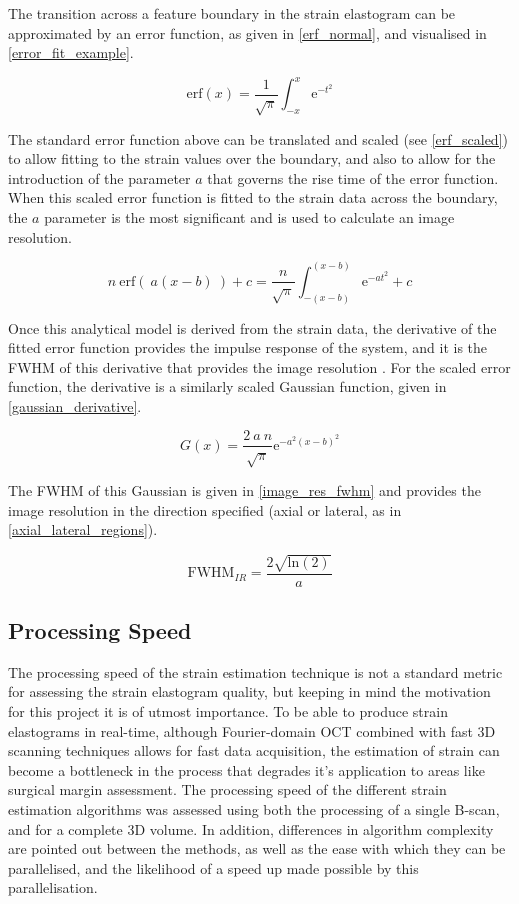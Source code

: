 The transition across a feature boundary in the strain elastogram can be approximated by an error function, as given in \autoref{erf_normal}, and visualised in \autoref{error_fit_example}. 

\begin{equation}
	\text{erf}(x)=\frac{1}{\sqrt{\pi}} \int_{-x}^{x} \text{e}^{-t^2}
	\label{erf_normal}
\end{equation}

The standard error function above can be translated and scaled (see \autoref{erf_scaled}) to allow fitting to the strain values over the boundary, and also to allow for the introduction of the parameter $a$ that governs the rise time of the error function. When this scaled error function is fitted to the strain data across the boundary, the $a$ parameter is the most significant and is used to calculate an image resolution.

\begin{equation}
	n \: \text{erf}(\:a(x-b)\:) + c = \frac{n}{\sqrt{\pi}} \int_{-(x-b)}^{(x-b)} \text{e}^{-a t^2} + c
	\label{erf_scaled}
\end{equation}

Once this analytical model is derived from the strain data, the derivative of the fitted error function provides the impulse response of the system, and it is the FWHM of this derivative that provides the image resolution \cite{hepburn_improving_2017}. For the scaled error function, the derivative is a similarly scaled Gaussian function, given in \autoref{gaussian_derivative}.

\begin{equation}
	G(x) = \frac{2\:a\:n}{\sqrt{\pi}} \text{e}^{-a^2 (x-b)^2}
	\label{gaussian_derivative}
\end{equation}

The FWHM of this Gaussian is given in \autoref{image_res_fwhm} and provides the image resolution in the direction specified (axial or lateral, as in \autoref{axial_lateral_regions}).

\begin{equation}
	\text{FWHM}_{IR} = \frac{2 \sqrt{\text{ln}(2)}}{a}
	\label{image_res_fwhm}
\end{equation}

\subsection{Processing Speed}
The processing speed of the strain estimation technique is not a standard metric for assessing the strain elastogram quality, but keeping in mind the motivation for this project it is of utmost importance. To be able to produce strain elastograms in real-time, although Fourier-domain OCT combined with fast 3D scanning techniques allows for fast data acquisition, the estimation of strain can become a bottleneck in the process that degrades it's application to areas like surgical margin assessment.
The processing speed of the different strain estimation algorithms was assessed using both the processing of a single B-scan, and for a complete 3D volume. In addition, differences in algorithm complexity are pointed out between the methods, as well as the ease with which they can be parallelised, and the likelihood of a speed up made possible by this parallelisation.
